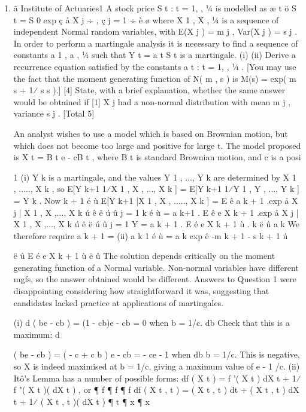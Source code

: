 \documentclass[a4paper,1pt]{article}
\begin{document}
\begin{enumerate}
\item
ã Institute of Actuaries1
A stock price {S t : t = 1, , 1⁄4} is modelled as
æ t
ö
S t = S 0 exp ç å X j ÷ ,
ç j = 1 ÷
è
ø
where X 1 , X  , 1⁄4 is a sequence of independent Normal random variables, with
E(X j ) = m j , Var(X j ) = s  j .
In order to perform a martingale analysis it is necessary to find a sequence of
constants a 1 , a  , 1⁄4 such that Y t = a t S t is a martingale.
(i)
(ii)
Derive a recurrence equation satisfied by the constants { a t : t = 1, , 1⁄4 }.
[You may use the fact that the moment generating function of N( m , s  ) is
M(s) = exp( m s + 1⁄ s  s  ).]
[4]
State, with a brief explanation, whether the same answer would be obtained if
[1]
X j had a non-normal distribution with mean m j , variance s  j .
[Total 5]

An analyst wishes to use a model which is based on Brownian motion, but which does
not become too large and positive for large t. The model proposed is
X t = B t e - cB t ,
where B t is standard Brownian motion, and c is a posi%

1
(i)
Y k is a martingale, and the values Y 1 , ..., Y k are determined by X 1 , ....., X k , so
E[Y k+1 1⁄X 1 , X  , ..., X k ] = E[Y k+1 1⁄Y 1 , Y  , ..., Y k ] = Y k .
Now
k + 1
é
ù
E[Y k+1 |X 1 , X  , ....., X k ] = E ê a k + 1 .exp å X j | X 1 , X  ,..., X k ú
ê ë
ú û
j = 1
k
é
ù
= a k+1 . E ê e X k + 1 .exp å X j | X 1 , X  ,..., X k ú
ê ë
ú û
j = 1
Y
= a k + 1 . E é e X k + 1 ù . k
ë
û a
k
We therefore require
a k + 1 =
(ii)
a k
1
é
ù
= a k exp ê -m k + 1 - s  k + 1 ú

ë
û
E é e X k + 1 ù
ë
û
The solution depends critically on the moment generating function of a
Normal variable. Non-normal variables have different mgfs, so the answer
obtained would be different.
Answers to Question 1 were disappointing considering how straightforward it
was, suggesting that candidates lacked practice at applications of
martingales.

(i)
d
( be - cb ) = (1 - cb)e - cb = 0 when b = 1/c.
db
Check that this is a maximum:
d 

( be - cb ) = ( -  c + c  b ) e - cb = - ce - 1 when
db
b = 1/c. This is negative, so X is indeed maximised at b = 1/c, giving a
maximum value of e - 1 /c.
(ii)
Itô's Lemma has a number of possible forms:
df ( X t ) = f '( X t ) dX t + 1⁄ f "( X t )( dX t )  , or
¶ f
¶ f
¶  f
df ( X t , t ) = ( X t , t ) dt + ( X t , t ) dX t + 1⁄  ( X t , t )( dX t ) 
¶ t
¶ x
¶ x


\end{enumerate}
\end{document}

